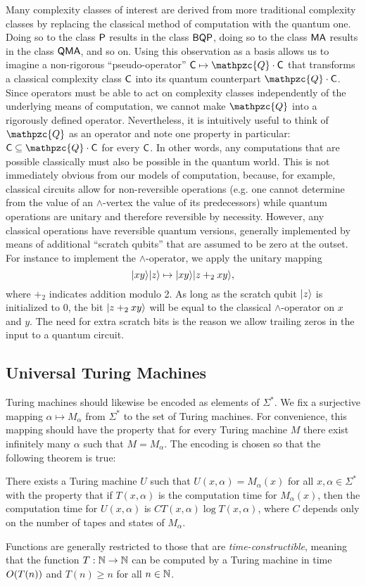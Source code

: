 Many complexity classes of interest are derived from more traditional complexity
classes by replacing the classical method of computation with the quantum
one. Doing so to the class $\mathsf{P}$ results in the class $\mathsf{BQP}$, doing so to
the class $\mathsf{MA}$ results in the class $\mathsf{QMA}$, and so on. Using this
observation as a basis allows us to imagine a non-rigorous ``pseudo-operator''
$\sC\mapsto\mathpzc{Q}\cdot\sC$ that transforms a classical complexity class $\mathsf{C}$
into its quantum counterpart $\mathpzc{Q}\cdot\sC$. Since operators must be able to
act on complexity classes independently of the underlying means of computation,
we cannot make $\mathpzc{Q}$ into a rigorously defined operator. Nevertheless, it is
intuitively useful to think of $\mathpzc{Q}$ as an operator and note one property in
particular: $\sC\subseteq\mathpzc{Q}\cdot\sC$ for every $\mathsf{C}$. In other words, any
computations that are possible classically must also be possible in the quantum 
world. This is not immediately obvious from our models of computation, because, 
for example, classical circuits allow for non-reversible operations (e.g. one 
cannot determine from the value of an $\wedge$-vertex the value of its 
predecessors) while quantum operations are unitary and therefore reversible by 
necessity. However, any classical operations have reversible quantum versions, 
generally implemented by means of additional ``scratch qubits'' that are assumed
to be zero at the outset. For instance to implement the $\wedge$-operator, we 
apply the unitary mapping
\[
|xy\rangle|z\rangle\mapsto|xy\rangle|z+_2xy\rangle,
\]
where $+_2$ indicates addition modulo 2. As long as the scratch qubit
$|z\rangle$ is initialized to 0, the bit $|z+_2xy\rangle$ will be equal to the
classical $\wedge$-operator on $x$ and $y$. The need for extra scratch bits is
the reason we allow trailing zeros in the input to a quantum circuit.

\subsection{Universal Turing Machines}

Turing machines should likewise be encoded as elements of $\Sigma^*$. We fix a
surjective mapping $\alpha\mapsto M_\alpha$ from $\Sigma^*$ to the set of Turing
machines. For convenience, this mapping should have the property that for every
Turing machine $M$ there exist infinitely many $\alpha$ such that
$M=M_\alpha$. The encoding is chosen so that the following theorem is true:
\begin{theorem}\label{universal-machine}
There exists a Turing machine $U$ such that $U(x,\alpha)=M_\alpha(x)$ for all
$x,\alpha\in\Sigma^*$ with the property that if $T(x,\alpha)$ is the computation
time for $M_\alpha(x)$, then the computation time for $U(x,\alpha)$ is
$CT(x,\alpha)\log T(x,\alpha)$, where $C$ depends only on the number of tapes
and states of $M_\alpha$.
\end{theorem}
Functions are generally restricted to those that are
\textit{time-constructible}, meaning that the function $T:\mathbb{N}\rightarrow\mathbb{N}$ can be
computed by a Turing machine in time $O(T(n))$ and $T(n)\geq n$ for all
$n\in\mathbb{N}$.

